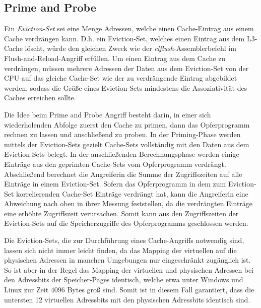 \subsection{Prime and Probe}

Ein \textit{Eviction-Set} sei eine Menge Adressen, welche einen Cache-Eintrag aus einem Cache verdrängen kann. D.h. ein Eviction-Set, welches einen Eintrag aus dem L3-Cache löscht, würde den gleichen Zweck wie der \textit {clflush}-Assemblerbefehl im Flush-and-Reload-Angriff erfüllen. 
Um einen Eintrag aus dem Cache zu verdrängen, müssen mehrere Adressen der Daten aus dem Eviction-Set von der CPU auf das gleiche Cache-Set wie der zu verdrängende Eintrag abgebildet werden, sodass die Größe eines Eviction-Sets mindestens die Assoziativität des Caches erreichen sollte.

Die Idee beim Prime and Probe Angriff besteht darin, in einer sich wiederholenden Abfolge zuerst den Cache zu primen, dann das Opferprogramm rechnen zu lassen und anschließend zu proben.
In der Priming-Phase werden mittels der Eviction-Sets gezielt Cache-Sets vollständig mit den Daten aus dem Eviction-Sets belegt.
In der anschließenden Berechnungsphase werden einige Einträge aus den geprimten Cache-Sets vom Opferprogramm verdrängt. Abschließend berechnet die Angreiferin die Summe der Zugriffszeiten auf alle Einträge in einem Eviction-Set.
Sofern das Opferprogramm in dem zum Eviction-Set korrelierenden Cache-Set Einträge verdrängt hat, kann die Angreiferin eine Abweichung nach oben in ihrer Messung feststellen, da die verdrängten Einträge eine erhöhte Zugriffszeit verursachen. Somit kann aus den Zugriffszeiten der Eviction-Sets auf die Speicherzugriffe des Opferprogramms geschlossen werden.

Die Eviction-Sets, die zur Durchführung eines Cache-Angriffs notwendig sind, lassen sich nicht immer leicht finden, da das Mapping der virtuellen auf die physischen Adressen in manchen Umgebungen nur eingeschränkt zugänglich ist.
So ist aber in der Regel das Mapping der virtuellen und physischen Adressen bei den Adressbits der Speicher-Pages identisch, welche etwa unter Windows und Linux zur Zeit 4096 Bytes groß sind. Somit ist in diesem Fall garantiert, dass die untersten 12 virtuellen Adressbits mit den physischen Adressbits identisch sind. 


